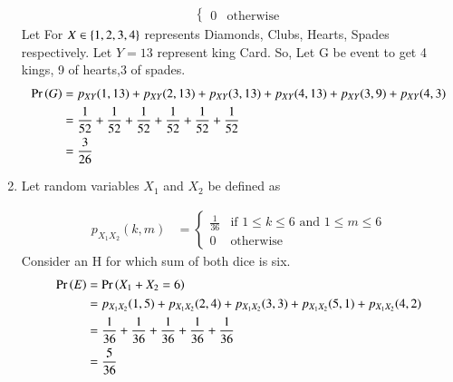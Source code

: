 \documentclass[journal,12pt,twocolumn]{IEEEtran}
\theoremstyle{remark}
\begin{document}
\begin{enumerate}
\begin{align}
\begin{cases}
            0 & \text{otherwise}
        \end{cases}\label{eq:3}
    \end{align}
Let For $X \in \left\{1,2,3,4\right\}$ represents Diamonds, Clubs, Hearts, Spades respectively. Let $Y=13$ represent king Card. So, Let G be event to get 4 kings, 9 of hearts,3 of spades.
\begin{align}
\Pr\left(G\right)&=p_{XY}(1,13)+p_{XY}(2,13)+p_{XY}(3,13)+p_{XY}(4,13)+p_{XY}(3,9)+p_{XY}(4,3)\\
&=\frac{1}{52}+\frac{1}{52}+\frac{1}{52}+\frac{1}{52}+\frac{1}{52}+\frac{1}{52}\\
&=\frac{3}{26}
\end{align}
\item  Let random variables $X_1$ and $X_2$ be defined as
\begin{table}[!ht]
	
\end{table}
\begin{align}
        p_{X_1X_2}(k,m) &= 
        \begin{cases}
            \frac{1}{36} & \text{if }1 \leq k \leq 6 \text{ and }1 \leq m \leq 6\\
            0 & \text{otherwise}
        \end{cases}\label{eq:4}
    \end{align}
Consider an H for which sum of both dice is six.
  \begin{align}
 \Pr\left(E\right)&=\Pr\left(X_1+X_2 = 6\right)\\
 &=p_{X_1X_2}(1,5)+p_{X_1X_2}(2,4)+p_{X_1X_2}(3,3)+p_{X_1X_2}(5,1)+p_{X_1X_2}(4,2)\\
 &=\frac{1}{36}+\frac{1}{36}+\frac{1}{36}+\frac{1}{36}+\frac{1}{36}\\
 &=\frac{5}{36} 
 \end{align}
    \end{enumerate}
    
\end{document}
